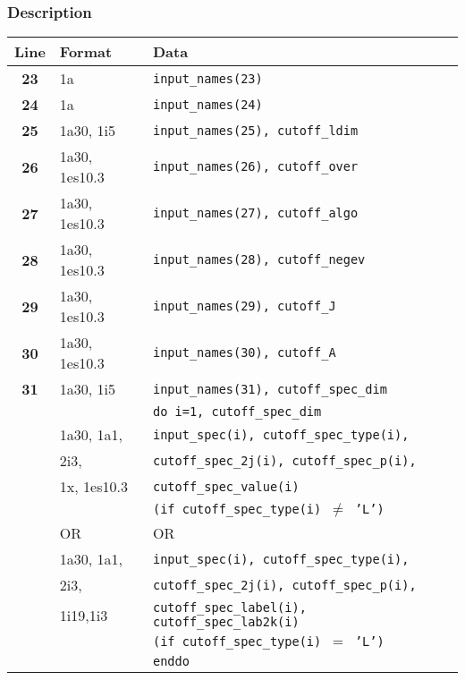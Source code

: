 \documentclass[a4paper,11pt]{article}
\begin{document}
\subsubsection*{Description}
\begin{center}
\begin{tabular}{|c|l|l|}
\hline
Line & Format & Data \\
\hline
 \textbf{23}   & 1a    & \tt input\_names(23)                          \\
 \textbf{24}   & 1a    & \tt input\_names(24)                          \\
 \textbf{25}   & 1a30, 1i5 & \tt input\_names(25), cutoff\_ldim        \\
 \textbf{26}   & 1a30, 1es10.3 & \tt input\_names(26), cutoff\_over    \\
 \textbf{27}   & 1a30, 1es10.3 & \tt input\_names(27), cutoff\_algo    \\
 \textbf{28}   & 1a30, 1es10.3 & \tt input\_names(28), cutoff\_negev   \\
 \textbf{29}   & 1a30, 1es10.3 & \tt input\_names(29), cutoff\_J       \\
 \textbf{30}   & 1a30, 1es10.3 & \tt input\_names(30), cutoff\_A       \\
 \textbf{31}   & 1a30, 1i5 & \tt input\_names(31), cutoff\_spec\_dim   \\
               &           & \tt do i=1, cutoff\_spec\_dim           \\
 \textbf{  }   & 1a30, 1a1,  & \:\: \tt input\_spec(i), cutoff\_spec\_type(i),   \\
 \textbf{  }   & 2i3,        & \:\: \tt cutoff\_spec\_2j(i), cutoff\_spec\_p(i), \\
 \textbf{  }   & 1x, 1es10.3 & \:\: \tt cutoff\_spec\_value(i) \\
 \textbf{  }   &             & \:\: \tt (if cutoff\_spec\_type(i) $\ne$ 'L') \\
 \textbf{  }   &  OR         & \:\: OR \\
 \textbf{  }   & 1a30, 1a1,  & \:\: \tt input\_spec(i), cutoff\_spec\_type(i),   \\
 \textbf{  }   & 2i3,        & \:\: \tt cutoff\_spec\_2j(i), cutoff\_spec\_p(i), \\
 \textbf{  }   & 1i19,1i3    & \:\: \tt cutoff\_spec\_label(i), cutoff\_spec\_lab2k(i) \\
 \textbf{  }   &             & \:\: \tt (if cutoff\_spec\_type(i) $=$ 'L') \\
               &           & \tt enddo                               \\
\hline
\end{tabular}
\end{center}
\end{document}
